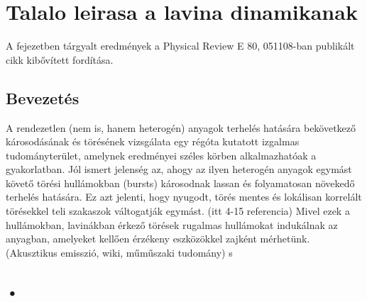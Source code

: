 \chapter{Talalo leirasa a lavina dinamikanak}
\label{chapter:thesispoint_1}
A fejezetben tárgyalt eredmények a Physical Review E 80, 051108-ban publikált cikk
kibővített fordítása.

\section{Bevezetés}
A rendezetlen (nem is, hanem heterogén) anyagok terhelés hatására bekövetkező károsodásának és törésének vizsgálata
egy régóta kutatott izgalmas tudományterület, amelynek eredményei széles körben alkalmazhatóak
a gyakorlatban.\cite{thsp1_herrmann1990,thsp1_chakrabarti1997} Jól ismert jelenség az, ahogy
az ilyen heterogén anyagok egymást követő törési hullámokban (bursts) károsodnak lassan és folyamatosan növekedő terhelés hatására. Ez azt jelenti, hogy nyugodt, törés mentes és
lokálisan korrelált törésekkel teli szakaszok váltogatják egymást.  (itt 4-15 referencia)
Mivel ezek a hullámokban, lavinákban érkező törések rugalmas hullámokat indukálnak az anyagban,
amelyeket kellően érzékeny eszközökkel zajként mérhetünk. (Akusztikus emisszió, wiki, műműszaki tudomány) s



\section{•}